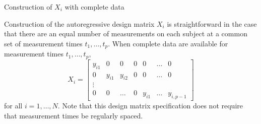 \begin{example}{Construction of $X_i$ with complete data} \label{example:construction-of-X}

\vspace{.3cm} 

Construction of the autoregressive design matrix $X_i$ is straightforward in the case that there are an equal number of measurements on each subject at a common set of measurement times $t_1,\dots, t_p$. When complete data are available for measurement times $t_1, \dots, t_p$, 
\begin{equation}
X_i =  \begin{bmatrix} 
y_{i1} & 0 & 0 & 0 &0&\dots & 0 \\
 0 & y_{i 1} &  y_{i2}&0 &0& \dots & 0 \\
 \vdots &&&&&&\\
 0 & 0 & \dots &0 & y_{i1} & \dots &  y_{i,{p-1}}
\end{bmatrix}
\end{equation}
\noindent
for all $i = 1,\dots, N$. Note that this design matrix specification does not require that measurement times be regularly spaced.  
\end{example}


